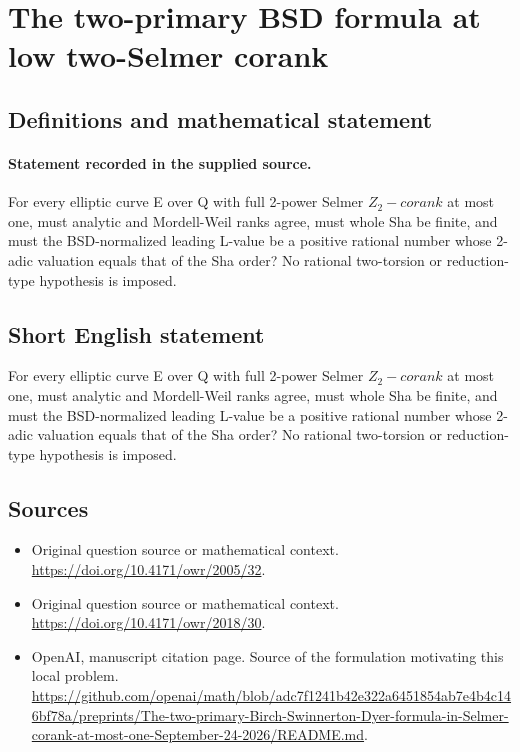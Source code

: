 \documentclass[11pt]{article}
\begin{document}
\section*{The two-primary BSD formula at low two-Selmer corank}\label{statement}
\subsection{Definitions and mathematical statement}
\paragraph{Statement recorded in the supplied source.}
For every elliptic curve E over Q with full 2-power Selmer $Z_2-corank$ at most one, must analytic and Mordell-Weil ranks agree, must whole Sha be finite, and must the BSD-normalized leading L-value be a positive rational number whose 2-adic valuation equals that of the Sha order? No rational two-torsion or reduction-type hypothesis is imposed.
\subsection{Short English statement}
For every elliptic curve E over Q with full 2-power Selmer $Z_2-corank$ at most one, must analytic and Mordell-Weil ranks agree, must whole Sha be finite, and must the BSD-normalized leading L-value be a positive rational number whose 2-adic valuation equals that of the Sha order? No rational two-torsion or reduction-type hypothesis is imposed.
\subsection{Sources}
\begin{itemize}
\item[S1] Original question source or mathematical context.
\url{https://doi.org/10.4171/owr/2005/32}.
\item[S2] Original question source or mathematical context.
\url{https://doi.org/10.4171/owr/2018/30}.
\item[S3] OpenAI, manuscript citation page. Source of the formulation motivating this local problem.
\url{https://github.com/openai/math/blob/adc7f1241b42e322a6451854ab7e4b4c146bf78a/preprints/The-two-primary-Birch-Swinnerton-Dyer-formula-in-Selmer-corank-at-most-one-September-24-2026/README.md}.
\end{itemize}
\end{document}
